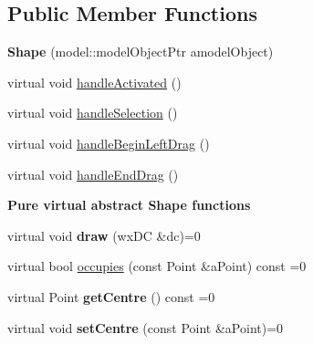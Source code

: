 \subsection*{Public Member Functions}
\begin{DoxyCompactItemize}
\item 
{\bfseries Shape} (model\+::\+model\+Object\+Ptr a\+model\+Object)\hypertarget{class_view_1_1_shape_afb97a8a335b877e5541c3c9844e5959c}{}\label{class_view_1_1_shape_afb97a8a335b877e5541c3c9844e5959c}

\item 
virtual void \hyperlink{class_view_1_1_shape_ac128288b584db6de840f7ec20493aafd}{handle\+Activated} ()
\item 
virtual void \hyperlink{class_view_1_1_shape_a62035e3329fede659614b5ce2060a0f3}{handle\+Selection} ()
\item 
virtual void \hyperlink{class_view_1_1_shape_abfe27e44508e837d8d62de605b32dd61}{handle\+Begin\+Left\+Drag} ()
\item 
virtual void \hyperlink{class_view_1_1_shape_a0ffded9065c593ce94e3db4d27078bec}{handle\+End\+Drag} ()
\end{DoxyCompactItemize}
\begin{Indent}{\bf Pure virtual abstract Shape functions}\par
\begin{DoxyCompactItemize}
\item 
virtual void {\bfseries draw} (wx\+DC \&dc)=0\hypertarget{class_view_1_1_shape_a47a18af27ae3664dd61b56a52a61dd05}{}\label{class_view_1_1_shape_a47a18af27ae3664dd61b56a52a61dd05}

\item 
virtual bool \hyperlink{class_view_1_1_shape_a7a202614a593376dcfae7baf892604b1}{occupies} (const Point \&a\+Point) const =0
\item 
virtual Point {\bfseries get\+Centre} () const =0\hypertarget{class_view_1_1_shape_a4f958c233208b77c7f5aa2c380b27b3f}{}\label{class_view_1_1_shape_a4f958c233208b77c7f5aa2c380b27b3f}

\item 
virtual void {\bfseries set\+Centre} (const Point \&a\+Point)=0\hypertarget{class_view_1_1_shape_af833b07b29d58eb0538f88aefdef29bc}{}\label{class_view_1_1_shape_af833b07b29d58eb0538f88aefdef29bc}

\end{DoxyCompactItemize}
\end{Indent}
